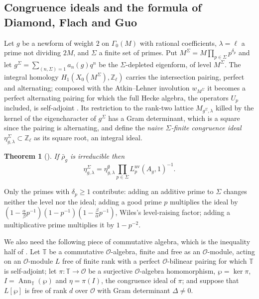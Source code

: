 \documentclass[11pt]{amsart}
\newtheorem{theorem}{Theorem}[section]
\theoremstyle{definition}
\newcommand{\Z}{\mathbb{Z}}
\newcommand{\T}{\mathbb{T}}
\newcommand{\nv}{\mathrm{nv}}
\begin{document}
\subsection{Congruence ideals and the formula of Diamond, Flach and Guo}\label{sec:dfg}
Let $g$ be a newform of weight $2$ on $\Gamma_0(M)$ with rational coefficients, $\lambda=\ell$ a prime not dividing $2M$, and $\Sigma$ a finite set of primes. Put $M^\Sigma=M\prod_{p\in\Sigma}p^{\delta_p}$ and let $g^\Sigma=\sum_{(n,\Sigma)=1}a_n(g)q^n$ be the $\Sigma$-depleted eigenform, of level $M^\Sigma$. The integral homology $H_1(X_0(M^\Sigma),\Z_\ell)$ carries the intersection pairing, perfect and alternating; composed with the Atkin--Lehner involution $w_{M^\Sigma}$ it becomes a perfect alternating pairing for which the full Hecke algebra, the operators $U_p$ included, is self-adjoint \cite[\S4.4]{DDT}. Its restriction to the rank-two lattice $M_{g^\Sigma,\lambda}$ killed by the kernel of the eigencharacter of $g^\Sigma$ has a Gram determinant, which is a square since the pairing is alternating, and \cite[\S1.7.3]{DFG04} define the \emph{naive $\Sigma$-finite congruence ideal} $\eta^\Sigma_{g,\lambda}\subset\Z_\ell$ as its square root, an integral ideal.

\begin{theorem}[{\cite[Proposition 1.4(c)]{DFG04}}]\label{thm:dfg14}
If $\bar\rho_g$ is irreducible then
\[
\eta^\Sigma_{g,\lambda}=\eta^{\emptyset}_{g,\lambda}\prod_{p\in\Sigma}L_p^{\nv}(A_g,1)^{-1}.
\]
\end{theorem}
Only the primes with $\delta_p\ge1$ contribute: adding an additive prime to $\Sigma$ changes neither the level nor the ideal; adding a good prime $p$ multiplies the ideal by $(1-\frac\alpha\beta p^{-1})(1-p^{-1})(1-\frac\beta\alpha p^{-1})$, Wiles's level-raising factor; adding a multiplicative prime multiplies it by $1-p^{-2}$.

We also need the following piece of commutative algebra, which is the inequality half of \cite[Lemma 4.17]{DDT}. Let $\T$ be a commutative $\mathcal{O}$-algebra, finite and free as an $\mathcal{O}$-module, acting on an $\mathcal{O}$-module $L$ free of finite rank with a perfect $\mathcal{O}$-bilinear pairing for which $\T$ is self-adjoint; let $\pi\colon\T\to\mathcal{O}$ be a surjective $\mathcal{O}$-algebra homomorphism, $\wp=\ker\pi$, $I=\operatorname{Ann}_\T(\wp)$ and $\eta=\pi(I)$, the congruence ideal of $\pi$; and suppose that $L[\wp]$ is free of rank $d$ over $\mathcal{O}$ with Gram determinant $\Delta\ne0$.
\end{document}
